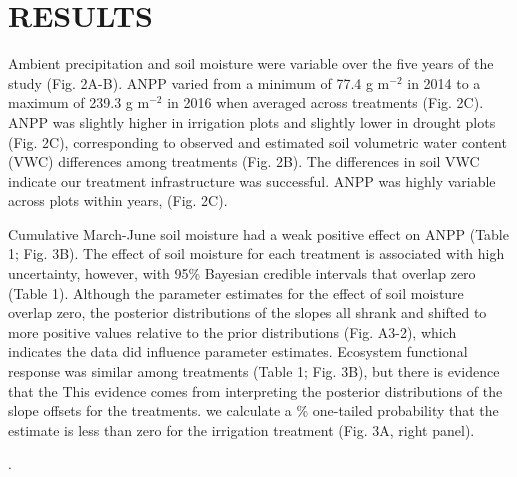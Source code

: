 \documentclass[fleqn,10pt,lineno]{wlpeerj} %
\begin{document}
\hypertarget{results}{%
\section{RESULTS}\label{results}}

Ambient precipitation and soil moisture were variable over the five
years of the study (Fig. 2A-B). ANPP varied from a minimum of 77.4 g
m\(^{-2}\) in 2014 to a maximum of 239.3 g m\(^{-2}\) in 2016 when
averaged across treatments (Fig. 2C). ANPP was slightly higher in
irrigation plots  and slightly lower in
drought plots 
(Fig. 2C), corresponding to observed and estimated soil volumetric water
content (VWC) differences among treatments (Fig. 2B).
The differences in soil VWC indicate our treatment infrastructure was
successful. ANPP was highly variable across plots within years,
(Fig. 2C).

Cumulative March-June soil moisture had a weak positive effect on ANPP
(Table 1; Fig. 3B). The effect of soil moisture for each treatment is
associated with high uncertainty, however, with 95\% Bayesian credible
intervals that  overlap zero (Table 1). Although the
parameter estimates for the effect of soil moisture overlap zero, the
posterior distributions of the slopes all shrank and shifted to more
positive values relative to the prior distributions (Fig. A3-2), which
indicates the data did influence parameter estimates. Ecosystem
functional response was similar among treatments (Table 1; Fig. 3B), but
there is evidence that the
This evidence comes from interpreting the posterior distributions of the
slope offsets for the treatments.  we
calculate a \% one-tailed probability that the estimate is less
than zero for the irrigation treatment
(Fig. 3A, right panel).

.
\end{document}
